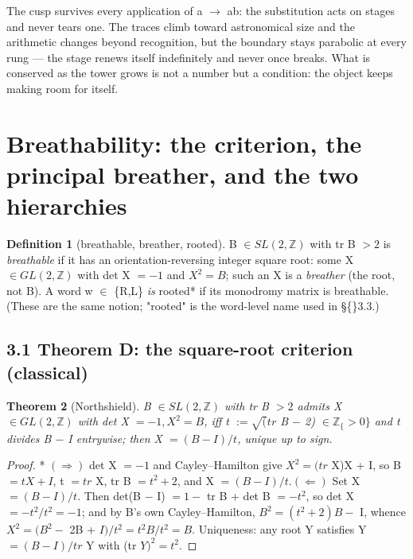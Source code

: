 \documentclass[11pt]{article}
\theoremstyle{plain}
\newtheorem{theorem}{Theorem}[section]
\theoremstyle{definition}
\newtheorem{definition}[theorem]{Definition}
\theoremstyle{remark}
\begin{document}
The cusp survives every application of a \(\to \) ab: the substitution acts on stages and never tears one. The traces climb toward astronomical size and the arithmetic changes beyond recognition, but the boundary stays parabolic at every rung — the stage renews itself indefinitely and never once breaks. What is conserved as the tower grows is not a number but a condition: the object keeps making room for itself.

\section{Breathability: the criterion, the principal breather, and the two hierarchies}

\begin{definition}[breathable, breather, rooted]
B \(\in  SL(2,\mathbb{Z})\) with tr B \(> 2\) is \emph{breathable} if it has an orientation-reversing integer square root: some X \(\in  GL(2,\mathbb{Z})\) with det X \(= -1\) and \(X^{2} = B\); such an X is a \emph{breather} (the root, not B). A word w \(\in \) \{R,L\}\emph{ is }rooted* if its monodromy matrix is breathable. (These are the same notion; "rooted" is the word-level name used in \S\{\}3.3.)
\end{definition}

\subsection{3.1 Theorem D: the square-root criterion (classical)}

\begin{theorem}[Northshield]
B \(\in  SL(2,\mathbb{Z})\) with tr B \(> 2\) admits X \(\in  GL(2,\mathbb{Z})\) with det X \(= -1, X^{2} = B\), iff t \(:= \surd (tr\) B \(-\) 2) \(\in  \mathbb{Z}_\{>0\}\) and t divides B \(-\) I entrywise; then X \(= (B - I)/t\), unique up to sign.
\end{theorem}

\begin{proof}* \((\Longrightarrow )\) det X \(= -1\) and Cayley–Hamilton give \(X^{2} = (tr\) X)X + I, so B \(= tX + I\), t \(= tr\) X, tr B \(= t^{2} + 2\), and X \(= (B - I)/t. (\Longleftarrow )\) Set X \(= (B - I)/t\). Then det(B \(-\) I) \(= 1 -\) tr B + det B \(= -t^{2}\), so det X \(= -t^{2}/t^{2} = -1\); and by B's own Cayley–Hamilton, \(B^{2} = (t^{2}+2)B -\) I, whence \(X^{2} = (B^{2} -\) 2B + \(I)/t^{2} = t^{2}B/t^{2} = B\). Uniqueness: any root Y satisfies Y \(= (B - I)/tr\) Y with (tr \(Y)^{2} = t^{2}\). \end{proof}
\end{document}
